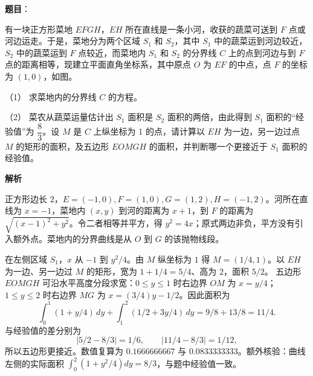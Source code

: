 \begin{answer}

\textbf{题目}：

有一块正方形菜地 \(EFGH\)，\(EH\) 所在直线是一条小河，收获的蔬菜可送到 \(F\) 点或河边运走。于是，菜地分为两个区域 \(S_1\) 和 \(S_2\)，其中 \(S_1\) 中的蔬菜运到河边较近，\(S_2\) 中的蔬菜运到 \(F\) 点较近，而菜地内 \(S_1\) 和 \(S_2\) 的分界线 \(C\) 上的点到河边与到 \(F\) 点的距离相等，现建立平面直角坐标系，其中原点 \(O\) 为 \(EF\) 的中点，点 \(F\) 的坐标为 \((1,0)\)，如图。

（1） 求菜地内的分界线 \(C\) 的方程。

（2） 菜农从蔬菜运量估计出 \(S_1\) 面积是 \(S_2\) 面积的两倍，由此得到 \(S_1\) 面积的“经验值”为 \(\dfrac{8}{3}\)。设 \(M\) 是 \(C\) 上纵坐标为 1 的点，请计算以 \(EH\) 为一边，另一边过点 \(M\) 的矩形的面积，及五边形 \(EOMGH\) 的面积，并判断哪一个更接近于 \(S_1\) 面积的经验值。
\nopagebreak[4]
\begin{center}\end{center}
\nopagebreak[4]
\textbf{解析}


正方形边长 \(2\)，\(E=(-1,0),F=(1,0),G=(1,2),H=(-1,2)\)。河所在直线为 \(x=-1\)，菜地内 \((x,y)\) 到河的距离为 \(x+1\)，到 \(F\) 的距离为 \(\sqrt{(x-1)^2+y^2}\)。令二者相等并平方，得 \(y^2=4x\)；原式两边非负，平方没有引入额外点。菜地内的分界曲线是从 \(O\) 到 \(G\) 的该抛物线段。

在左侧区域 \(S_1\)，\(x\) 从 \(-1\) 到 \(y^2/4\)。由 \(M\) 纵坐标为 \(1\) 得 \(M=(1/4,1)\)。以 \(EH\) 为一边、另一边过 \(M\) 的矩形，宽为 \(1+1/4=5/4\)、高为 \(2\)，面积 \(5/2\)。
五边形 \(EOMGH\) 可沿水平高度分段求宽：\(0\le y\le1\) 时右边界 \(OM\) 为 \(x=y/4\)；\(1\le y\le2\) 时右边界 \(MG\) 为 \(x=(3/4)y-1/2\)。因此面积为
\nopagebreak[4]
\[
\int_0^1(1+y/4)\,dy+\int_1^2(1/2+3y/4)\,dy=9/8+13/8=11/4.
\]
与经验值的差分别为
\nopagebreak[4]
\[
|5/2-8/3|=1/6,\qquad |11/4-8/3|=1/12,
\]
所以五边形更接近。数值复算为 \(0.1666666667\) 与 \(0.0833333333\)。额外核验：曲线左侧的实际面积 \(\int_0^2(1+y^2/4)dy=8/3\)，与题中经验值一致。



\end{answer}
